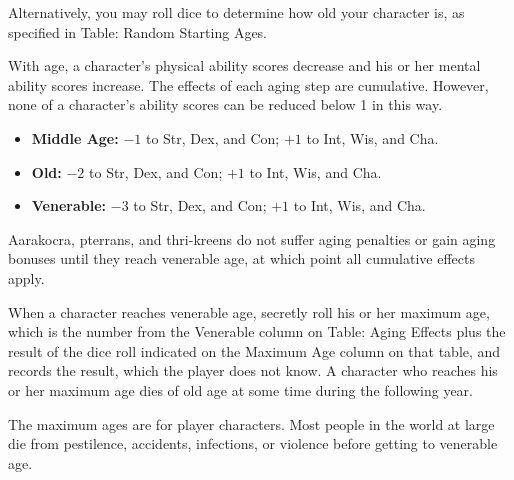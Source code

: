 \documentclass[10pt,a4paper,twocolumn]{d20}
\begin{document}
{Alternatively, you may roll dice to determine how old your character is, as specified in Table: Random Starting Ages.

With age, a character’s physical ability scores decrease and his or her mental ability scores increase. The effects of each aging step are cumulative. However, none of a character’s ability scores can be reduced below 1 in this way.

\begin{itemize}
\setlength\itemsep{0em}
\item \textbf{Middle Age:} $-1$ to Str, Dex, and Con; \hskip10pt $+1$ to Int, Wis, and Cha.
\item \textbf{Old:} $-2$ to Str, Dex, and Con; $+1$ to Int, Wis, and Cha.
\item \textbf{Venerable:} $-3$ to Str, Dex, and Con; \hskip20pt $+1$ to Int, Wis, and Cha.
\end{itemize}

Aarakocra, pterrans, and thri-kreens do not suffer aging penalties or gain aging bonuses until they reach venerable age, at which point all cumulative effects apply.

When a character reaches venerable age, secretly roll his or her maximum age, which is the number from the Venerable column on Table: Aging Effects plus the result of the dice roll indicated on the Maximum Age column on that table, and records the result, which the player does not know. A character who reaches his or her maximum age dies of old age at some time during the following year.

The maximum ages are for player characters. Most people in the world at large die from pestilence, accidents, infections, or violence before getting to venerable age.


}
\end{document}
